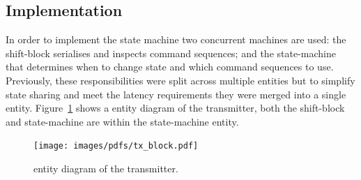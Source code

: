 \subsection{Implementation} %
\label{sub:tx_implementation}
%     
In order to implement the state machine two concurrent machines are used: the shift-block serialises and inspects command sequences; and the state-machine that determines when to change state and which command sequences to use. Previously, these responsibilities were split across multiple entities but to simplify state sharing and meet the latency requirements they were merged into a single entity. Figure~\ref{fig:tx_entity} shows a entity diagram of the transmitter, both the shift-block and state-machine are within the state-machine entity.
    
\begin{figure}[htbp]
  \centering
  \texttt{[image: images/pdfs/tx\_block.pdf]}
  \caption{entity diagram of the transmitter.}
  \label{fig:tx_entity}
\end{figure}
        
